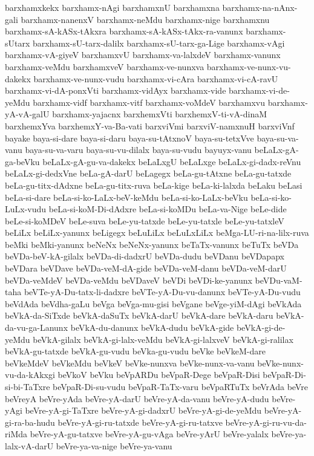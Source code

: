 {barxhamxkekx
barxhamx-nAgi
barxhamxnU
barxhamxna
barxhamx-na-nAnx-gali
barxhamx-nanenxV
barxhamx-neMdu
barxhamx-nige
barxhamxnu
barxhamx-sA-kASx-tAkxra
barxhamx-sA-kASx-tAkx-ra-vanunx
barxhamx-sUtarx
barxhamx-sU-tarx-dalilx
barxhamx-sU-tarx-ga-Lige
barxhamx-vAgi
barxhamx-vA-giyeV
barxhamxvU
barxhamx-va-lalxdeV
barxhamx-vanunx
barxhamx-veMdu
barxhamxveV
barxhamx-ve-nunxva
barxhamx-ve-nunx-vu-dakekx
barxhamx-ve-nunx-vudu
barxhamx-vi-cAra
barxhamx-vi-cA-ravU
barxhamx-vi-dA-ponxVti
barxhamx-vidAyx
barxhamx-vide
barxhamx-vi-de-yeMdu
barxhamx-vidf
barxhamx-vitf
barxhamx-voMdeV
barxhamxvu
barxhamx-yA-vA-galU
barxhamx-yajacnx
barxhemxVti
barxhemxV-ti-vA-dinaM
barxhemxYva
barxhemxY-va-Ba-vati
barxviVmi
barxviV-namxnuH
barxviVnf
bayake
baya-si-dare
baya-si-daru
baya-su-tAtxnoV
baya-su-tetxVve
baya-su-va-vanu
baya-su-va-varu
baya-su-vu-dilalx
baya-su-vudu
bayuyx-vanu
beLaLx-gA-ga-beVku
beLaLx-gA-gu-va-dakekx
beLaLxgU
beLaLxge
beLaLx-gi-dadx-reVnu
beLaLx-gi-dedxVne
beLa-gA-darU
beLagegx
beLa-gu-tAtxne
beLa-gu-tatxde
beLa-gu-titx-dAdxne
beLa-gu-titx-ruva
beLa-kige
beLa-ki-lalxda
beLaku
beLasi
beLa-si-dare
beLa-si-ko-LaLx-beV-keMdu
beLa-si-ko-LaLx-beVku
beLa-si-ko-LuLx-vudu
beLa-si-koM-Di-dAdxre
beLa-si-koMDu
beLa-va-Nige
beLe-dide
beLe-si-koMDeV
beLe-suva
beLe-yu-tatxde
beLe-yu-tatxle
beLe-yu-tatxleV
beLiLx
beLiLx-yanunx
beLigegx
beLuLiLx
beLuLxLiLx
beMga-LU-ri-na-lilx-ruva
beMki
beMki-yanunx
beNeNx
beNeNx-yanunx
beTaTx-vanunx
beTuTx
beVDa
beVDa-beV-kA-gilalx
beVDa-di-dadxrU
beVDa-dudu
beVDanu
beVDapapx
beVDara
beVDave
beVDa-veM-dA-gide
beVDa-veM-danu
beVDa-veM-darU
beVDa-veMdeV
beVDa-veMdu
beVDaveV
beVDi
beVDi-ke-yanunx
beVDu-vaM-taha
beVTe-yA-Du-tatx-li-dadxre
beVTe-yA-Du-vu-danunx
beVTe-yA-Du-vudu
beVdAda
beVdha-gaLu
beVga
beVga-mu-gisi
beVgane
beVge-yiM-dAgi
beVkAda
beVkA-da-SiTxde
beVkA-daSuTx
beVkA-darU
beVkA-dare
beVkA-daru
beVkA-da-vu-ga-Lanunx
beVkA-du-danunx
beVkA-dudu
beVkA-gide
beVkA-gi-de-yeMdu
beVkA-gilalx
beVkA-gi-lalx-veMdu
beVkA-gi-lalxveV
beVkA-gi-ralilax
beVkA-gu-tatxde
beVkA-gu-vudu
beVka-gu-vudu
beVke
beVkeM-dare
beVkeMdeV
beVkeMdu
beVkeV
beVke-nunxva
beVke-nunx-va-vanu
beVke-nunx-vu-da-kAkxgi
beVkoV
beVku
beVpARDu
beVpaR-Dege
beVpaR-Disi
beVpaR-Di-si-bi-TaTxre
beVpaR-Di-su-vudu
beVpaR-TaTx-varu
beVpaRTuTx
beVrAda
beVre
beVreyA
beVre-yAda
beVre-yA-darU
beVre-yA-da-vanu
beVre-yA-dudu
beVre-yAgi
beVre-yA-gi-TaTxre
beVre-yA-gi-dadxrU
beVre-yA-gi-de-yeMdu
beVre-yA-gi-ra-ba-hudu
beVre-yA-gi-ru-tatxde
beVre-yA-gi-ru-tatxve
beVre-yA-gi-ru-vu-da-riMda
beVre-yA-gu-tatxve
beVre-yA-gu-vAga
beVre-yArU
beVre-yalalx
beVre-ya-lalx-vA-darU
beVre-ya-va-nige
beVre-ya-vanu
}
